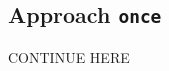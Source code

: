 \subsection{Approach \texttt{once}}\label{sec:pbf_iterbin:once}

\begin{todobox}
  CONTINUE HERE %
\end{todobox}